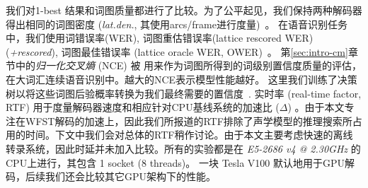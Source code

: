 
我们对1-best 结果和词图质量都进行了比较。为了公平起见，我们保持两种解码器得出相同的词图密度 ({\em{lat.den.}}, 其使用arcs/frame进行度量)~\cite{woodland19951994}。
在语音识别任务中，我们使用词错误率(WER), 词图重估错误率(lattice rescored WER) ({\em{+rescored}}), 词图最佳错误率 (lattice oracle WER, OWER)~\cite{hoffmeister2006frame}。
第\ref{sec:intro-cm}章节中的{\em 归一化交叉熵 } (NCE) \cite{zhc00-chen-icassp2017}被 用来作为词图所得到的词级别置信度质量的评估，在大词汇连续语音识别中。越大的NCE表示模型性能越好。
这里我们训练了决策树以将这些词图后验概率转换为我们最终需要的置信度~\cite{chen2017confidence,chen2017unified}.
实时率 (real-time factor, RTF) 用于度量解码器速度和相应针对CPU基线系统的加速比 ($\Delta$) 。由于本文专注在WFST解码的加速上，因此我们所报道的RTF排除了声学模型的推理搜索所占用的时间。下文中我们会对总体的RTF稍作讨论。由于本文主要考虑快速的离线转录系统，因此时延并未加入比较。所有的实验都是在  {\em{E5-2686 v4 @ 2.30GHz}} 的CPU上进行，其包含 1 socket (8 threads)。 %
一块 Tesla V100 默认地用于GPU解码，后续我们还会比较其它GPU架构下的性能。


